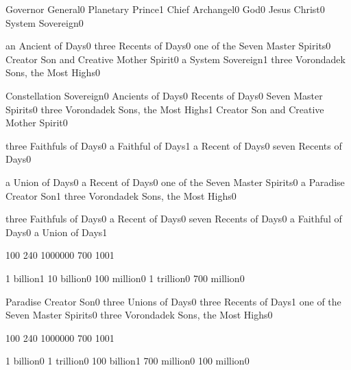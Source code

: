 {Governor General}{0}
{Planetary Prince}{1}
{Chief Archangel}{0}
{God}{0}
{Jesus Christ}{0}
{System Sovereign}{0}
\qstop

{an Ancient of Days}{0}
{three Recents of Days}{0}
{one of the Seven Master Spirits}{0}
{Creator Son and Creative Mother Spirit}{0}
{a System Sovereign}{1}
{three Vorondadek Sons, the Most Highs}{0}
\qstop

{Constellation Sovereign}{0}
{Ancients of Days}{0}
{Recents of Days}{0}
{Seven Master Spirits}{0}
{three Vorondadek Sons, the Most Highs}{1}
{Creator Son and Creative Mother Spirit}{0}
\qstop

{three Faithfuls of Days}{0}
{a Faithful of Days}{1}
{a Recent of Days}{0}
{seven Recents of Days}{0}
\qstop

{a Union of Days}{0}
{a Recent of Days}{0}
{one of the Seven Master Spirits}{0}
{a Paradise Creator Son}{1}
{three Vorondadek Sons, the Most Highs}{0}
\qstop

{three Faithfuls of Days}{0}
{a Recent of Days}{0}
{seven Recents of Days}{0}
{a Faithful of Days}{0}
{a Union of Days}{1}
\qstop

{10}{0}
{24}{0}
{100000}{0}
{70}{0}
{100}{1}
\qstop

{1 billion}{1}
{10 billion}{0}
{100 million}{0}
{1 trillion}{0}
{700 million}{0}
\qstop

{Paradise Creator Son}{0}
{three Unions of Days}{0}
{three Recents of Days}{1}
{one of the Seven Master Spirits}{0}
{three Vorondadek Sons, the Most Highs}{0}
\qstop

{10}{0}
{24}{0}
{100000}{0}
{70}{0}
{100}{1}
\qstop

{1 billion}{0}
{1 trillion}{0}
{100 billion}{1}
{700 million}{0}
{100 million}{0}
\qstop

